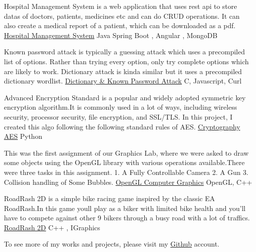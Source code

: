 \documentclass[]{awesome-cv}
\begin{document}
\vspace{-7mm}






\begin{cventries}
	\cventry
	{Hospital Management System is a web application that uses rest api to store datas of doctors, patients, medicines etc and can do CRUD operations. It can also create a medical report of a patient, which can be downloaded as a pdf.}
	{\href{https://github.com/minhaz725/Hospital-Management-System}{\underline{Hospital Management System}}}
	{Java Spring Boot , Angular , MongoDB}
	{}
	{}
	
	\vspace{-5mm}
	\cventry
	{Known password attack is typically a guessing attack which uses a precompiled list of options. Rather than trying every option, only try complete options which are likely to work. Dictionary attack is kinda similar but it uses a precompiled dictionary wordlist.}
	{\href{https://github.com/minhaz725/Dictionary-And-Known-Password-Attack-On-A-Local-Server}{\underline{Dictionary \& Known Password Attack}}}
	{C, Javascript, Curl}
	{}
	{}
	
	
	\vspace{-5mm}
	\cventry
	{Advanced Encryption Standard is a popular and widely adopted symmetric key encryption algorithm.It is commonly used in a lot of ways, including wireless security, processor security, file encryption, and SSL/TLS. In this project, I created this algo following the following standard rules of AES.}
	{\href{https://github.com/minhaz725/Cryptography-AES}{\underline{Cryptography AES}}}
	{Python}
	{}
	{}
	
	
	\vspace{-5mm}
	\cventry
	{This was the first assignment of our Graphics Lab, where we were asked to draw some objects using the OpenGL library with various operations available.There were three tasks in this assignment.
		1. A Fully Controllable Camera
		2. A Gun
		3. Collision handling of Some Bubbles. }
	{\href{https://github.com/minhaz725/OpenGL-Computer-Graphics}{\underline{OpenGL Computer Graphics}}}
	{OpenGL, C++}
	{}
	{}
	
	\vspace{-5mm}
	\cventry
	{RoadRash 2D is a simple bike racing game inspired by the classic EA RoadRash.In this game you\textquotesingle{}ll play as a biker with limited bike health and you'll have to compete against other 9 bikers through a busy road with a lot of traffics.}
	{\href{https://github.com/minhaz725/RoadRash2D}{\underline{RoadRash 2D}}}
	{C++ , IGraphics}
	{}
	{}
	
	\vspace{-5mm}
	
	\cventry
	{}
	{To see more of my works and projects, please visit my \href{https://github.com/minhaz725}{\underline{Github}} account. }
	{}
	{}
	{}
	
	\vspace{-5mm}
\end{cventries}

\ 
\end{document}
